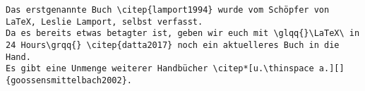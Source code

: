 \inputminted[breaklines]{bibtex}{exercises/literature/literature.done.bib}

\begin{verbatim}
Das erstgenannte Buch \citep{lamport1994} wurde vom Schöpfer von LaTeX, Leslie Lamport, selbst verfasst.
Da es bereits etwas betagter ist, geben wir euch mit \glqq{}\LaTeX\ in 24 Hours\grqq{} \citep{datta2017} noch ein aktuelleres Buch in die Hand.
Es gibt eine Unmenge weiterer Handbücher \citep*[u.\thinspace a.][]{goossensmittelbach2002}.



\end{verbatim}